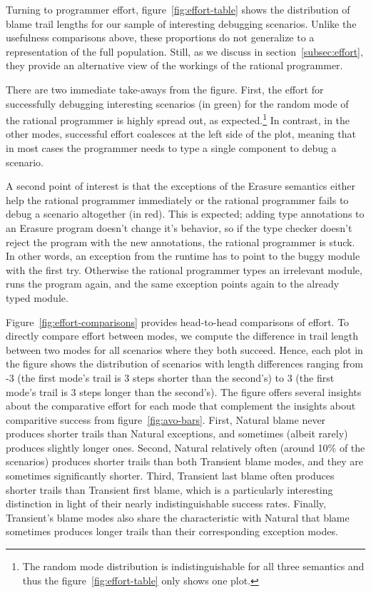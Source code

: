 Turning to programmer effort, figure~\ref{fig:effort-table} shows the distribution of blame trail lengths
for our sample of interesting debugging scenarios. Unlike the usefulness
comparisons above, these proportions do not generalize to a representation of the full population.
Still, as we discuss in section~\ref{subsec:effort}, they provide an
alternative view of the workings of the rational programmer. 

There are
two immediate take-aways from the figure. First, the effort for successfully
debugging interesting scenarios (in green) for the random mode of the
rational programmer is highly spread out, as expected.\footnote{The
random mode distribution is indistinguishable for all three semantics and thus the figure~\ref{fig:effort-table} 
only shows one plot.} In contrast, in the other modes, successful effort coalesces at
the left side of the plot, meaning that in most cases the programmer needs
to type a single component to debug a scenario. 

A second point of interest is that the exceptions of
the Erasure semantics either help the rational programmer immediately or 
the rational programmer fails to debug a scenario altogether (in red).
This is expected; adding type annotations to an Erasure program doesn't
change it's behavior, so if the type checker doesn't reject the
program with the new annotations, the rational programmer is stuck.
In other words, an
exception from the runtime has to point to the buggy module with
the first try. Otherwise the rational programmer types an irrelevant
module, runs the program again, and the same exception points again to the
already typed module. 

Figure~\ref{fig:effort-comparisons} provides head-to-head comparisons of effort.
To directly compare effort between modes, we compute the difference in trail length between two modes for all scenarios where they both succeed.
Hence, each plot in the figure shows the distribution of scenarios with length differences ranging from -3 (the first mode's trail is 3 steps shorter than the second's) to 3 (the first mode's trail is 3 steps longer than the second's).
The figure offers several insights about the comparative effort for each mode that complement the insights about comparitive success from figure~\ref{fig:avo-bars}.
First, Natural blame never produces shorter trails than Natural exceptions, and sometimes (albeit rarely) produces slightly longer ones.
Second, Natural relatively often (around 10\% of the scenarios) produces shorter trails than both Transient blame modes, and they are sometimes significantly shorter.
Third, Transient last blame often produces shorter trails than Transient first blame, which is a particularly interesting distinction in light of their nearly indistinguishable success rates.
Finally, Transient's blame modes also share the characteristic with Natural that blame sometimes produces longer trails than their corresponding exception modes.

